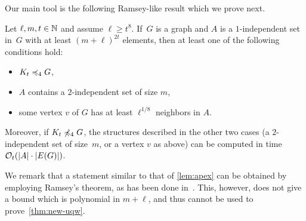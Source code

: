 Our main tool is the following Ramsey-like result which we prove
next. 

\begin{lemma}\label{lem:apex}
Let $\ell,m,t\in \mathbb{N}$ and assume $\ell\geq t^{8}$. 
If~$G$ is a graph and $A$ is a $1$-independent set in~$G$
with at least $(m+\ell)^{2t}$ elements,
then at least one of the following conditions hold:
\begin{itemize}
  \item $K_t\preccurlyeq_{4} G$,
\item  $A$ contains a $2$-independent set of size $m$, 
\item  some vertex $v$ of $G$
has at least $\ell^{1/8}$ neighbors in $A$.
\end{itemize}
Moreover, if $K_t\not\preccurlyeq_4G$, the
structures described in the other two cases (a $2$-independent set 
of size~$m$, or a vertex $v$ as above) can be 
computed in time $\mathcal{O}_t(|A|\cdot |E(G)|)$. 
\end{lemma}

We remark that a statement similar to that of \cref{lem:apex}
can be obtained by employing Ramsey's theorem, as has been done in~\cite{nevsetvril2011nowhere}. This, however, 
does not give a bound which is polynomial in $m+\ell$, and thus cannot be used to prove~\cref{thm:new-uqw}.

